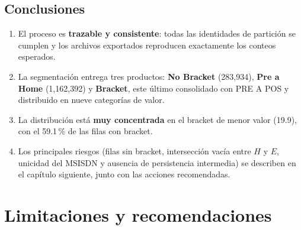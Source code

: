 \documentclass[11pt,a4paper,oneside]{book}
\newcommand{\pct}[1]{#1\,\%}
\begin{document}
\section{Conclusiones}
\begin{enumerate}
  \item El proceso es \textbf{trazable y consistente}: todas las identidades de partición se cumplen y los archivos exportados reproducen exactamente los conteos esperados.
  \item La segmentación entrega tres productos: \textbf{No Bracket} (283,934), \textbf{Pre a Home} (1,162,392) y \textbf{Bracket}, este último consolidado con PRE A POS y distribuido en nueve categorías de valor.
  \item La distribución está \textbf{muy concentrada} en el bracket de menor valor (19.9), con el \pct{59.1} de las filas con bracket.
  \item Los principales riesgos (filas sin bracket, intersección vacía entre $H$ y $E$, unicidad del MSISDN y ausencia de persistencia intermedia) se describen en el capítulo siguiente, junto con las acciones recomendadas.
\end{enumerate}

\chapter{Limitaciones y recomendaciones}\label{chap:limit}
\end{document}
